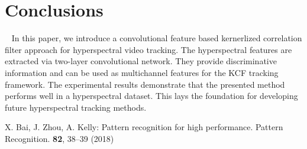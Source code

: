 \documentclass[runningheads,a4paper]{llncs}
\begin{document}
\section{Conclusions}~\label{sec:conclusions}
In this paper, we introduce a convolutional feature based kernerlized correlation filter approach for hyperspectral video tracking. The hyperspectral features are extracted via two-layer convolutional network. They provide discriminative information and can be used as multichannel features for the KCF tracking framework. The experimental results demonstrate that the presented method performs well in a hyperspectral dataset. This lays the foundation for developing future hyperspectral tracking methods.
\begin{thebibliography}{8}
X. Bai, J. Zhou, A. Kelly: Pattern recognition for high performance. Pattern Recognition. \textbf{82}, 38--39 (2018)


\end{thebibliography}
\end{document}
